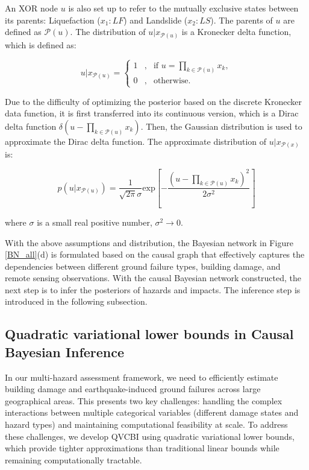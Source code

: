 \documentclass[review]{elsarticle}
\begin{document}
An XOR node $u$ is also set up to refer to the mutually exclusive states between its parents: Liquefaction ($x_{1}: LF$) and Landslide ($x_{2}: LS$). The parents of $u$ are defined as $\mathcal{P}(u)$. The distribution of $u|x_{\mathcal{P}(u)}$ is a Kronecker delta function, which is defined as:

\begin{equation*}
    u|x_{\mathcal{P}(u)} = \left\{
        \begin{aligned}
        1 & , & \text{if } u = \prod_{k \in \mathcal{P}(u)}x_{k}, \\
        0 & , & \text{otherwise}.
        \end{aligned}
        \right.
\end{equation*}

Due to the difficulty of optimizing the posterior based on the discrete Kronecker data function, it is first transferred into its continuous version, which is a Dirac delta function $\delta(u - \prod_{k \in \mathcal{P}(u)}x_{k})$. Then, the Gaussian distribution is used to approximate the Dirac delta function. The approximate distribution of $u|x_{\mathcal{P}(x)}$ is:

\begin{equation*}
    p(u|x_{\mathcal{P}(u)}) = \frac{1}{\sqrt{2\pi}\sigma}\text{exp}[-\frac{(u - \prod_{k \in \mathcal{P}(u)}x_{k})^{2}}{2\sigma^{2}}]
\end{equation*}

\noindent where $\sigma$ is a small real positive number, $\sigma^{2} \rightarrow 0$.

With the above assumptions and distribution, the Bayesian network in Figure \ref{BN_all}(d) is formulated based on the causal graph that effectively captures the dependencies between different ground failure types, building damage, and remote sensing observations. With the causal Bayesian network constructed, the next step is to infer the posteriors of hazards and impacts. The inference step is introduced in the following subsection.


\subsection{Quadratic variational lower bounds in Causal Bayesian Inference}

In our multi-hazard assessment framework, we need to efficiently estimate building damage and earthquake-induced ground failures across large geographical areas. This presents two key challenges: handling the complex interactions between multiple categorical variables (different damage states and hazard types) and maintaining computational feasibility at scale. To address these challenges, we develop QVCBI using quadratic variational lower bounds, which provide tighter approximations than traditional linear bounds while remaining computationally tractable.
\end{document}

